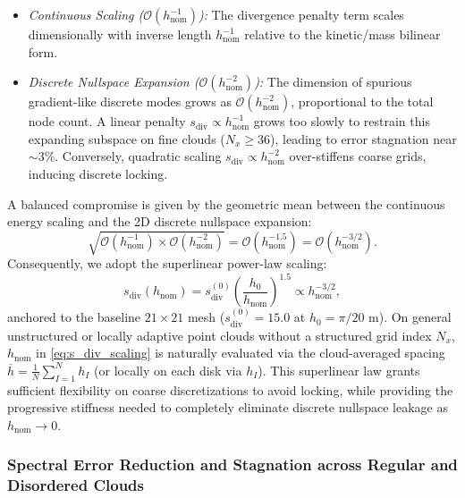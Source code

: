\documentclass[VANCOUVER,Times1COL]{WileyNJD-v5}
\begin{document}
\begin{enumerate}
          \begin{itemize}
              \item \emph{Continuous Scaling ($\mathcal{O}(h_{\mathrm{nom}}^{-1})$):} The divergence penalty term scales dimensionally with inverse length $h_{\mathrm{nom}}^{-1}$ relative to the kinetic/mass bilinear form.
              \item \emph{Discrete Nullspace Expansion ($\mathcal{O}(h_{\mathrm{nom}}^{-2})$):} The dimension of spurious gradient-like discrete modes grows as $\mathcal{O}(h_{\mathrm{nom}}^{-2})$, proportional to the total node count. A linear penalty $s_{\mathrm{div}} \propto h_{\mathrm{nom}}^{-1}$ grows too slowly to restrain this expanding subspace on fine clouds ($N_x \ge 36$), leading to error stagnation near $\sim 3\%$. Conversely, quadratic scaling $s_{\mathrm{div}} \propto h_{\mathrm{nom}}^{-2}$ over-stiffens coarse grids, inducing discrete locking.
          \end{itemize}
          A balanced compromise is given by the geometric mean between the continuous energy scaling and the 2D discrete nullspace expansion:
          \begin{equation}
              \sqrt{\mathcal{O}(h_{\mathrm{nom}}^{-1}) \times \mathcal{O}(h_{\mathrm{nom}}^{-2})} = \mathcal{O}(h_{\mathrm{nom}}^{-1.5}) = \mathcal{O}(h_{\mathrm{nom}}^{-3/2}).
          \end{equation}
          Consequently, we adopt the superlinear power-law scaling:
          \begin{equation}
              s_{\mathrm{div}}(h_{\mathrm{nom}}) = s_{\mathrm{div}}^{(0)} \left( \frac{h_0}{h_{\mathrm{nom}}} \right)^{1.5} \propto h_{\mathrm{nom}}^{-3/2},
              \label{eq:s_div_scaling}
          \end{equation}
          anchored to the baseline $21\times 21$ mesh ($s_{\mathrm{div}}^{(0)} = 15.0$ at $h_0 = \pi/20\text{ m}$). On general unstructured or locally adaptive point clouds without a structured grid index $N_x$, $h_{\mathrm{nom}}$ in \eqref{eq:s_div_scaling} is naturally evaluated via the cloud-averaged spacing $\overline{h} = \frac{1}{N}\sum_{I=1}^N h_I$ (or locally on each disk via $h_I$). This superlinear law grants sufficient flexibility on coarse discretizations to avoid locking, while providing the progressive stiffness needed to completely eliminate discrete nullspace leakage as $h_{\mathrm{nom}} \to 0$.
\end{enumerate}

\subsubsection{Spectral Error Reduction and Stagnation across Regular and Disordered Clouds}
\label{subsubsec:cavity_jitter_error}
\end{document}
